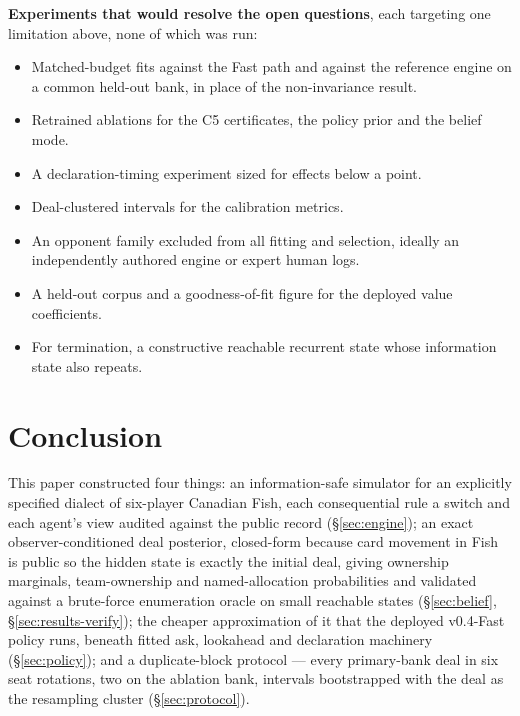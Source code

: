 \documentclass[11pt]{article}
\theoremstyle{definition}
\DeclareRobustCommand{\vfast}{\texorpdfstring{\mbox{v0.4-Fast}}{v0.4-Fast}}
\begin{document}
\textbf{Experiments that would resolve the open questions}, each targeting one
limitation above, none of which was run:

\begin{itemize}[leftmargin=1.4em,itemsep=0pt,topsep=2pt,parsep=0pt]
\item Matched-budget fits against the Fast path and against the reference engine
on a common held-out bank, in place of the non-invariance result.
\item Retrained ablations for the C5 certificates, the policy prior and the
belief mode.
\item A declaration-timing experiment sized for effects below a point.
\item Deal-clustered intervals for the calibration metrics.
\item An opponent family excluded from all fitting and selection, ideally an
independently authored engine or expert human logs.
\item A held-out corpus and a goodness-of-fit figure for the deployed value
coefficients.
\item For termination, a constructive reachable recurrent state whose
information state also repeats.
\end{itemize}
\section{Conclusion}
\label{sec:conclusion}

This paper constructed four things: an information-safe simulator for an
explicitly specified dialect of six-player Canadian Fish, each consequential
rule a switch and each agent's view audited against the public record
(\S\ref{sec:engine}); an exact observer-conditioned deal posterior, closed-form
because card movement in Fish is public so the hidden state is exactly the
initial deal, giving ownership marginals, team-ownership and named-allocation
probabilities and validated against a brute-force enumeration oracle on small
reachable states (\S\ref{sec:belief}, \S\ref{sec:results-verify}); the cheaper
approximation of it that the deployed \vfast{} policy runs, beneath fitted ask,
lookahead and declaration machinery (\S\ref{sec:policy}); and a duplicate-block
protocol --- every primary-bank deal in six seat rotations, two on the ablation
bank, intervals bootstrapped with the deal as the resampling cluster
(\S\ref{sec:protocol}).
\end{document}
